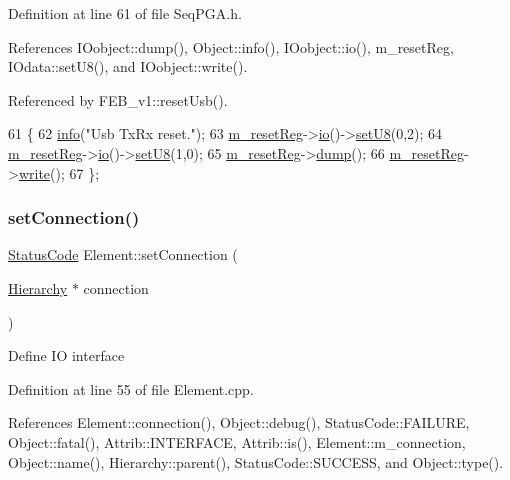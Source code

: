 Definition at line 61 of file Seq\+P\+G\+A.\+h.



References I\+Oobject\+::dump(), Object\+::info(), I\+Oobject\+::io(), m\+\_\+reset\+Reg, I\+Odata\+::set\+U8(), and I\+Oobject\+::write().



Referenced by F\+E\+B\+\_\+v1\+::reset\+Usb().


\begin{DoxyCode}
61                   \{
62     \hyperlink{classObject_a644fd329ea4cb85f54fa6846484b84a8}{info}(\textcolor{stringliteral}{"Usb TxRx reset."});
63     \hyperlink{classSeqPGA_a8c519e98b992ab872622e95dae4461d8}{m\_resetReg}->\hyperlink{classIOobject_af04fb94137c3d86849f478ac5afab5d1}{io}()->\hyperlink{classIOdata_a6c4fb2f2af01889ada889c2b7aceb24d}{setU8}(0,2);
64     \hyperlink{classSeqPGA_a8c519e98b992ab872622e95dae4461d8}{m\_resetReg}->\hyperlink{classIOobject_af04fb94137c3d86849f478ac5afab5d1}{io}()->\hyperlink{classIOdata_a6c4fb2f2af01889ada889c2b7aceb24d}{setU8}(1,0);
65     \hyperlink{classSeqPGA_a8c519e98b992ab872622e95dae4461d8}{m\_resetReg}->\hyperlink{classIOobject_a1247f08c84c1732a76caf07e987871e9}{dump}();
66     \hyperlink{classSeqPGA_a8c519e98b992ab872622e95dae4461d8}{m\_resetReg}->\hyperlink{classIOobject_a9f6984bc9f0fadcf800f1be2523ac744}{write}();
67   \};
\end{DoxyCode}
\mbox{\label{classElement_ab476b4b1df5954141ceb14f072433b89}} 
\subsubsection{\texorpdfstring{set\+Connection()}{setConnection()}}
{\footnotesize\ttfamily \hyperlink{classStatusCode}{Status\+Code} Element\+::set\+Connection (\begin{DoxyParamCaption}\item[{\hyperlink{classHierarchy}{Hierarchy} $\ast$}]{connection }\end{DoxyParamCaption})\hspace{0.3cm}{\ttfamily [inherited]}}

Define IO interface 

Definition at line 55 of file Element.\+cpp.



References Element\+::connection(), Object\+::debug(), Status\+Code\+::\+F\+A\+I\+L\+U\+RE, Object\+::fatal(), Attrib\+::\+I\+N\+T\+E\+R\+F\+A\+CE, Attrib\+::is(), Element\+::m\+\_\+connection, Object\+::name(), Hierarchy\+::parent(), Status\+Code\+::\+S\+U\+C\+C\+E\+SS, and Object\+::type().



